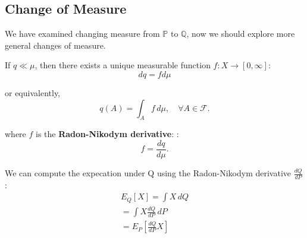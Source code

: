 \subsection{Change of Measure}
We have examined changing measure from $\mathbb{P}$ to $\mathbb{Q}$, 
now we should explore more general changes of measure.\\

\begin{theorem}

If $q \ll \mu$, then there exists a unique measurable function $f: X \to [0, \infty]$:
\[
dq = f d\mu
\]

or equivalently,
\[
q(A) = \int_A f \, d\mu, \quad \forall A \in \mathcal{F}.
\]

where $f$ is the \textbf{Radon-Nikodym derivative}:
:
\[
f = \frac{dq}{d\mu}.
\]
\end{theorem}

We can compute the expecation under Q using the Radon-Nikodym derivative $\frac{dQ}{dP}$:
\begin{align*}
    E_Q[X] = \int X \, dQ \\
    = \int X \frac{dQ}{dP} \, dP \\
    = E_P\left[\frac{dQ}{dP}X\right]
\end{align*}

